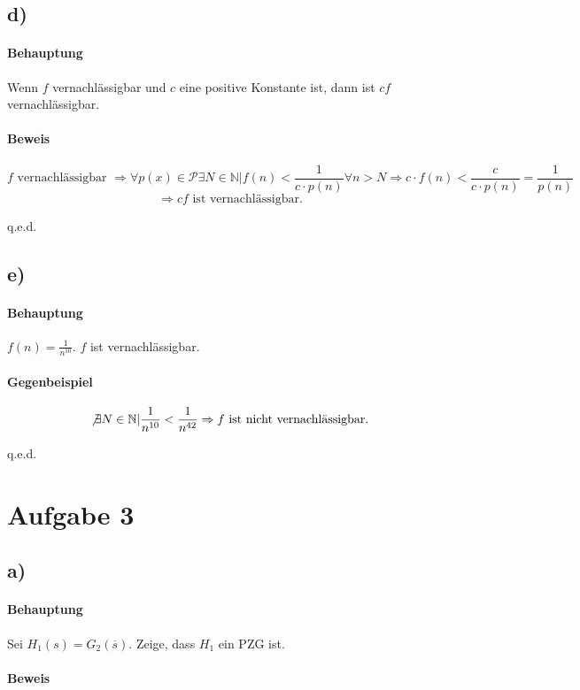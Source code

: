 \documentclass[a4paper,11pt,twoside]{scrartcl}
\begin{document}
\subsection*{d)}
\paragraph{Behauptung}
Wenn $f$ vernachlässigbar und $c$ eine positive Konstante ist, dann ist $cf$ vernachlässigbar.
\paragraph{Beweis}
\[ f \text{ vernachlässigbar }\Rightarrow \forall p(x)\in\mathcal{P} \exists N\in\mathbb{N} | f(n)<\frac{1}{c\cdot p(n)} \forall n>N\Rightarrow c\cdot f(n) < \frac{c}{c\cdot p(n)} = \frac{1}{p(n)}\]
\[ \Rightarrow cf \text{ ist vernachlässigbar.} \]
\begin{flushright}
	q.e.d.
\end{flushright}
\subsection*{e)}
\paragraph{Behauptung}
$f(n) = \frac{1}{n^{10}}$. $f$ ist vernachlässigbar.
\paragraph{Gegenbeispiel}
\[ \not\exists N\in\mathbb{N} | \frac{1}{n^{10}} < \frac{1}{n^{42}} \Rightarrow f\text{ ist nicht vernachlässigbar.} \]
\begin{flushright}
	q.e.d.
\end{flushright}
\section*{Aufgabe 3}
\subsection*{a)}

\paragraph{Behauptung}  Sei $H_1(s) = G_2(\overline{s})$.  Zeige, dass $H_1$ ein PZG ist.
\paragraph{Beweis}
\end{document}
